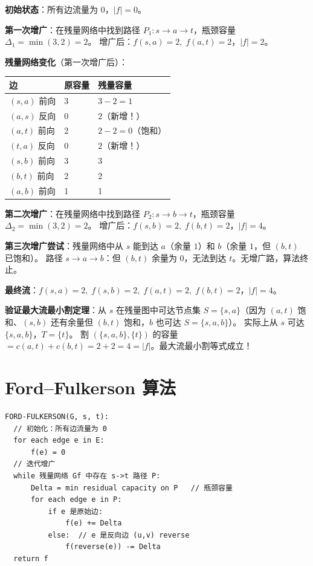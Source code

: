 \documentclass[UTF8,openany,12pt]{ctexbook}
\theoremstyle{remark}
\begin{document}
\noindent\textbf{初始状态}：所有边流量为 $0$，$|f|=0$。

\medskip
\noindent\textbf{第一次增广}：在残量网络中找到路径 $P_1: s\to a\to t$，瓶颈容量 $\Delta_1=\min(3,2)=2$。
增广后：$f(s,a)=2,\;f(a,t)=2$，$|f|=2$。

\medskip
\noindent\textbf{残量网络变化}（第一次增广后）：
\begin{center}
\begin{tabular}{lll}
\toprule
边 & 原容量 & 残量容量 \\
\midrule
$(s,a)$ 前向 & 3 & $3-2=1$ \\
$(a,s)$ 反向 & 0 & $2$（新增！）\\
$(a,t)$ 前向 & 2 & $2-2=0$（饱和）\\
$(t,a)$ 反向 & 0 & $2$（新增！）\\
$(s,b)$ 前向 & 3 & 3 \\
$(b,t)$ 前向 & 2 & 2 \\
$(a,b)$ 前向 & 1 & 1 \\
\bottomrule
\end{tabular}
\end{center}

\noindent\textbf{第二次增广}：在残量网络中找到路径 $P_2: s\to b\to t$，瓶颈容量 $\Delta_2=\min(3,2)=2$。
增广后：$f(s,b)=2,\;f(b,t)=2$，$|f|=4$。

\medskip
\noindent\textbf{第三次增广尝试}：残量网络中从 $s$ 能到达 $a$（余量 $1$）和 $b$（余量 $1$，但 $(b,t)$ 已饱和）。
路径 $s\to a\to b$：但 $(b,t)$ 余量为 $0$，无法到达 $t$。无增广路，算法终止。

\noindent\textbf{最终流}：$f(s,a)=2,\;f(s,b)=2,\;f(a,t)=2,\;f(b,t)=2$，$|f|=4$。

\noindent\textbf{验证最大流最小割定理}：从 $s$ 在残量图中可达节点集 $S=\{s,a\}$（因为 $(a,t)$ 饱和、$(s,b)$ 还有余量但 $(b,t)$ 饱和，$b$ 也可达 $S=\{s,a,b\}$）。
实际上从 $s$ 可达 $\{s,a,b\}$，$T=\{t\}$。
割 $(\{s,a,b\},\{t\})$ 的容量 $= c(a,t)+c(b,t)=2+2=4=|f|$。最大流最小割等式成立！

\section{Ford--Fulkerson 算法}

\begin{lstlisting}
FORD-FULKERSON(G, s, t):
  // 初始化：所有边流量为 0
  for each edge e in E:
      f(e) = 0
  // 迭代增广
  while 残量网络 Gf 中存在 s->t 路径 P:
      Delta = min residual capacity on P   // 瓶颈容量
      for each edge e in P:
          if e 是原始边:
              f(e) += Delta
          else:  // e 是反向边 (u,v) reverse
              f(reverse(e)) -= Delta
  return f
\end{lstlisting}
\end{document}
